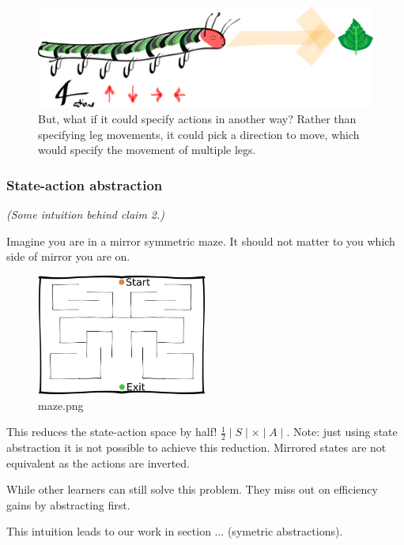 \begin{figure}[h!]
\centering
\includegraphics[width=\textwidth,height=0.25\textheight]{../../pictures/drawings/full-caterpillar.png}
\caption{But, what if it could specify actions in another way? Rather than specifying leg movements, it could pick a direction to move, which would specify the movement of multiple legs.}
\end{figure}

\subsubsection{State-action abstraction}

\emph{(Some intuition behind claim 2.)}

Imagine you are in a mirror symmetric maze. It should not matter to you
which side of mirror you are on.

\begin{figure}[hb!]
\centering
\includegraphics[width=0.5\textwidth,height=0.5\textheight]{../../pictures/drawings/maze.png}
\caption{maze.png}
\end{figure}

This reduces the state-action space by half!
\(\frac{1}{2}\mid S \mid \times \mid A \mid\). Note: just using state
abstraction it is not possible to achieve this reduction. Mirrored
states are not equivalent as the actions are inverted.

While other learners can still solve this problem. They miss out on
efficiency gains by abstracting first.

This intuition leads to our work in section ... (symetric abstractions).

